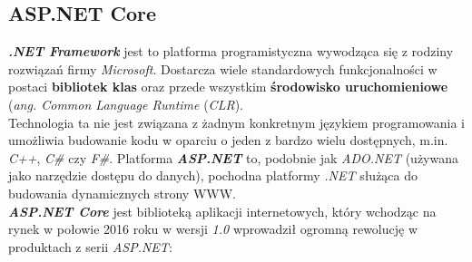 \subsection{ASP.NET Core}
\quad \textbf{\textit{.NET Framework}} jest to platforma programistyczna wywodząca się z rodziny rozwiązań firmy \textit{Microsoft}.  Dostarcza wiele standardowych funkcjonalności w postaci \textbf{bibliotek klas} oraz przede wszystkim \textbf{środowisko uruchomieniowe} (\textit{ang. Common Language Runtime} (\textit{CLR}). \\
Technologia ta nie jest związana z żadnym konkretnym językiem programowania i umożliwia budowanie kodu w oparciu o jeden z bardzo wielu dostępnych, m.in. \textit{C++}, \textit{C\#} czy \textit{F\#}. Platforma \textit{\textbf{ASP.NET}} to, podobnie jak \textit{ADO.NET} (używana jako narzędzie dostępu do danych), pochodna platformy \textit{.NET} służąca do budowania dynamicznych strony WWW. \\
    \textbf{\textit{ASP.NET Core}} jest biblioteką aplikacji internetowych, który wchodząc na rynek w połowie 2016 roku w wersji \textit{1.0} wprowadził ogromną rewolucję w produktach z serii \textit{ASP.NET}: 
